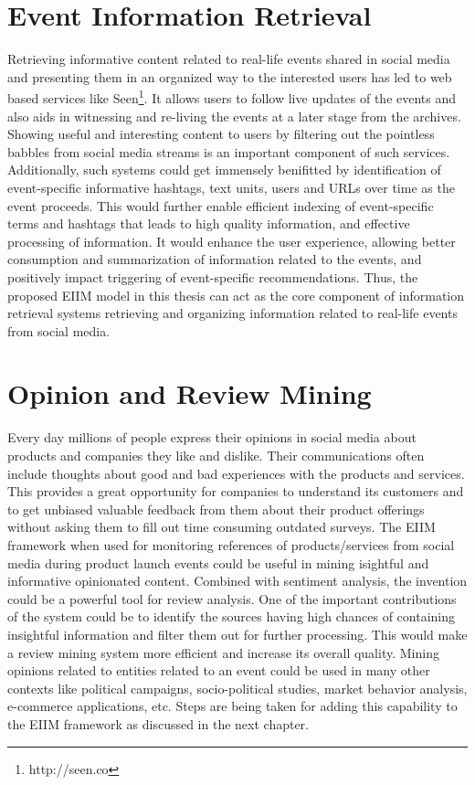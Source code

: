 \section{Event Information Retrieval}
Retrieving informative content related to real-life events shared in social media and presenting them in an organized way to the interested users has led to web based services like Seen\footnote{http://seen.co}. It allows users to follow live updates of the events and also aids in witnessing and re-living the events at a later stage from the archives. Showing useful and interesting content to users by filtering out the pointless babbles from social media streams is an important component of such services. Additionally, such systems could get immensely benifitted by identification of event-specific informative hashtags, text units, users and URLs over time as the event proceeds. This would further enable efficient indexing of event-specific terms and hashtags that leads to high quality information, and effective processing of information. It would enhance the user experience, allowing better consumption and summarization of information related to the events, and positively impact triggering of event-specific recommendations. Thus, the proposed EIIM model in this thesis can act as the core component of information retrieval systems retrieving and organizing information related to real-life events from social media. 

\section{Opinion and Review Mining}
Every day millions of people express their opinions in social media about products and companies they like and dislike. Their communications often include thoughts about good and bad experiences with the products and services. This provides a great opportunity for companies to understand its customers and to get unbiased valuable feedback from them about their product offerings without asking them to fill out time consuming outdated surveys. The EIIM framework when used for monitoring references of products/services from social media during product launch events could be useful in mining isightful and informative opinionated content. Combined with sentiment analysis, the invention could be a powerful tool for review analysis. One of the important contributions of the system could be to identify the sources having high chances of containing insightful information and filter them out for further processing. This would make a review mining system more efficient and increase its overall quality. Mining opinions related to entities related to an event could be used in many other contexts like political campaigns, socio-political studies, market behavior analysis, e-commerce applications, etc. Steps are being taken for adding this capability to the EIIM framework as discussed in the next chapter. 

